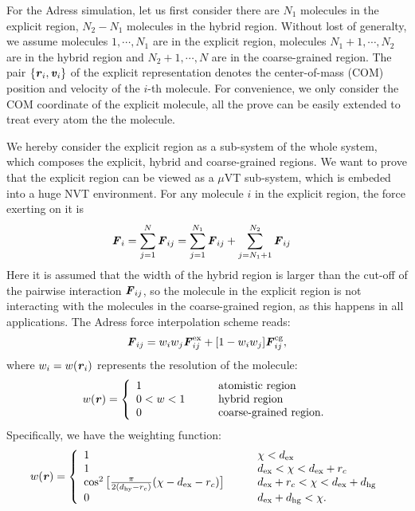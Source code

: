 \documentclass[aps,pre,preprint]{revtex4}
\renewcommand{\v}[1]{\textbf{\textit{#1}}}
\begin{document}
For the Adress simulation, let us first consider there are $N_1$
molecules in the explicit region, $N_2 - N_1$ molecules in the hybrid
region.  Without lost of generalty, we assume molecules $1, \cdots,
N_1$ are in the explicit region, molecules $N_1 + 1, \cdots, N_2$ are
in the hybrid region and $N_2+1, \cdots, N$ are in the coarse-grained
region. The pair $\{\v r_i, \v v_i\}$ of the explicit representation
denotes the center-of-mass (COM) position and velocity of the $i$-th
molecule. For convenience, we only consider the COM coordinate of the
explicit molecule, all the prove can be easily extended to treat every
atom the the molecule.

We hereby consider the explicit region as a sub-system of the whole
system, which composes the explicit, hybrid and coarse-grained
regions. We want to prove that the explicit region can be viewed as a
$\mu$VT sub-system, which is embeded into a huge NVT environment.
For any molecule $i$ in the explicit region, the force exerting on
it is
\begin{align}
  \v F_i &= \sum_{j=1}^{N}\v F_{ij} 
  =
  \sum_{j=1}^{N_1}\v F_{ij} + \sum_{j=N_1+1}^{N_2}\v F_{ij} 
\end{align}
Here it is assumed that the width of the hybrid region is larger than
the cut-off of the pairwise interaction $\v F_{ij}$, so the molecule
in the explicit region is not interacting with the molecules in the
coarse-grained region, as this happens in all applications.
The Adress force interpolation scheme reads:
\begin{align}\label{eqn:f-interp}
  \v F_{ij} = w_iw_j\v F^{\textrm{ex}}_{ij} + [1-w_iw_j]\v F^{\textrm{cg}}_{ij},
\end{align}
where $w_i = w(\v r_i)$ represents
the resolution of the molecule:
\begin{align}\label{eqn:w1}
  w(\v r) =
  \left\{
    \begin{array}{lcl}
      1 &\quad& \textrm{atomistic region}\\
      0<w<1  && \textrm{hybrid region}\\
      0 && \textrm{coarse-grained region}.
    \end{array}
  \right.
\end{align}
Specifically, we have the weighting function:
\begin{align}\label{eqn:w2}
  w(\v r) =
  \left\{
    \begin{array}{lcl}
      1 &\quad& \chi < d_{\textrm{ex}}\\
      1  && d_{\textrm{ex}} < \chi < d_{\textrm{ex}} + r_c\\
      \cos^2\big[\frac{\pi}{2(d_{\textrm{hy}} - r_c)} (\chi - d_{\textrm{ex}} - r_c)\big] && d_{\textrm{ex}} + r_c < \chi < d_{\textrm{ex}} + d_{\textrm{hg}} \\
      0 && d_{\textrm{ex}} + d_{\textrm{hg}}  < \chi.
    \end{array}
  \right.
\end{align}
\end{document}
